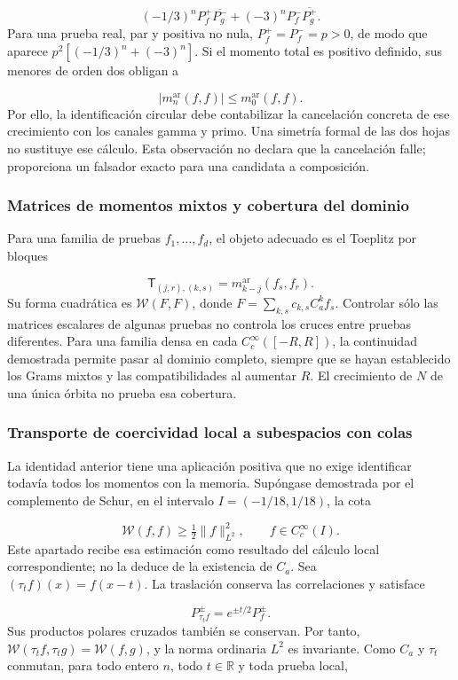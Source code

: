 \[
(-1/3)^nP_f^+\overline{P_g^-}
+(-3)^nP_f^-\overline{P_g^+}.
\]
Para una prueba real, par y positiva no nula, \(P_f^+=P_f^-=p>0\), de modo que aparece \(p^2[(-1/3)^n+(-3)^n]\). Si el momento total es positivo definido, sus menores de orden dos obligan a

\[
|m_n^{\mathrm{ar}}(f,f)|\le m_0^{\mathrm{ar}}(f,f).
\]
Por ello, la identificación circular debe contabilizar la cancelación concreta de ese crecimiento con los canales gamma y primo. Una simetría formal de las dos hojas no sustituye ese cálculo. Esta observación no declara que la cancelación falle; proporciona un falsador exacto para una candidata a composición.


\subsubsection{Matrices de momentos mixtos y cobertura del dominio}
\label{tm-add-m6-2}
Para una familia de pruebas \(f_1,\ldots,f_d\), el objeto adecuado es el Toeplitz por bloques

\[
\mathsf T_{(j,r),(k,s)}
=m_{k-j}^{\mathrm{ar}}(f_s,f_r).
\]
Su forma cuadrática es \(\mathscr W(F,F)\), donde \(F=\sum_{k,s}c_{k,s}C_a^k f_s\). Controlar sólo las matrices escalares de algunas pruebas no controla los cruces entre pruebas diferentes. Para una familia densa en cada \(C_c^\infty([-R,R])\), la continuidad demostrada permite pasar al dominio completo, siempre que se hayan establecido los Grams mixtos y las compatibilidades al aumentar \(R\). El crecimiento de \(N\) de una única órbita no prueba esa cobertura.


\subsubsection{Transporte de coercividad local a subespacios con colas}
\label{tm-add-m6-3}
\label{tm-add:familias-transportadas}
La identidad anterior tiene una aplicación positiva que no exige identificar todavía todos los momentos con la memoria. Supóngase demostrada por el complemento de Schur, en el intervalo \(I=(-1/18,1/18)\), la cota

\[
\mathscr W(f,f)\geq\tfrac12\|f\|_{L^2}^2,
\qquad f\in C_c^\infty(I).
\]
Este apartado recibe esa estimación como resultado del cálculo local correspondiente; no la deduce de la existencia de \(C_a\). Sea \((\tau_t f)(x)=f(x-t)\). La traslación conserva las correlaciones y satisface

\[
P_{\tau_t f}^{\pm}=e^{\pm t/2}P_f^{\pm}.
\]
Sus productos polares cruzados también se conservan. Por tanto, \(\mathscr W(\tau_t f,\tau_t g)=\mathscr W(f,g)\), y la norma ordinaria \(L^2\) es invariante. Como \(C_a\) y \(\tau_t\) conmutan, para todo entero \(n\), todo \(t\in\mathbb R\) y toda prueba local,

